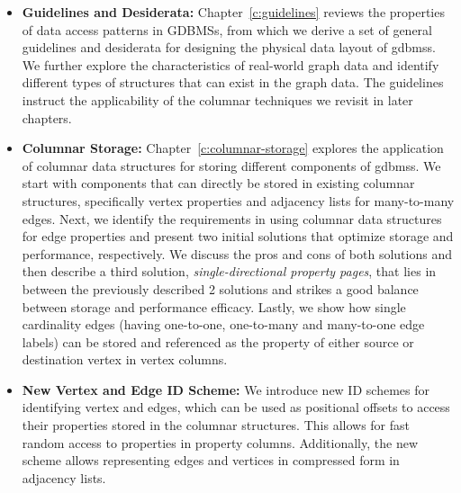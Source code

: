 \begin{itemize}
	\item \textbf{Guidelines and Desiderata:} Chapter~\ref{c:guidelines} reviews the properties of data access patterns in GDBMSs, from which we derive a set of general guidelines and desiderata for designing the physical data layout of \gls{gdbms}s. We further explore the characteristics of real-world graph data and identify different types of structures that can exist in the graph data. The guidelines instruct the applicability of the columnar techniques we revisit in later chapters.%
	
	\item \textbf{Columnar Storage:} Chapter~\ref{c:columnar-storage} explores the application of columnar data structures for storing different components of \gls{gdbms}s. We start with components that can directly be stored in existing columnar structures, specifically vertex properties and adjacency lists for many-to-many edges. Next, we identify the requirements in using columnar data structures for edge properties and present two initial solutions that optimize storage and performance, respectively. We discuss the pros and cons of both solutions and then describe a third solution, \emph{single-directional property pages}, that lies in between the previously described 2 solutions and strikes a good balance between storage and performance efficacy. Lastly, we show how single cardinality edges (having one-to-one, one-to-many and many-to-one edge labels) can be stored and referenced as the property of either source or destination vertex in vertex columns. %
	
	\item \textbf{New Vertex and Edge ID Scheme:} We introduce new ID schemes for identifying vertex and edges, which can be used as positional offsets to access their properties stored in the columnar structures. This allows for fast random access to properties in property columns. Additionally, the new scheme allows representing edges and vertices in compressed form in adjacency lists. 
	

\end{itemize}
